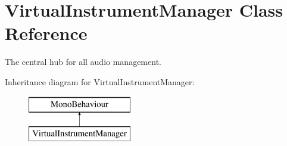 \hypertarget{class_virtual_instrument_manager}{}\section{Virtual\+Instrument\+Manager Class Reference}
\label{class_virtual_instrument_manager}


The central hub for all audio management.  


Inheritance diagram for Virtual\+Instrument\+Manager\+:\begin{figure}[H]
\begin{center}
\leavevmode
\includegraphics[height=2.000000cm]{class_virtual_instrument_manager}
\end{center}
\end{figure}
